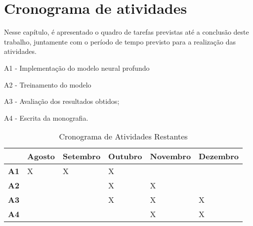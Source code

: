 \chapter{Cronograma de atividades}\label{cronograma}

Nesse capítulo, é apresentado o quadro de tarefas previstas até a conclusão deste
trabalho, juntamente com o período de tempo previsto para a realização das atividades.

A1 - Implementação do modelo neural profundo

A2 - Treinamento do modelo

A3 - Avaliação dos resultados obtidos;

A4 - Escrita da monografia.

\begin{table}[!htb]
\footnotesize
\centering
\caption{Cronograma de Atividades Restantes}
\label{tab:cronogramaativs}
\begin{tabular}{P{1cm}P{2cm}P{2cm}P{2cm}P{2cm}P{2cm}}
  \toprule
  & \textbf{Agosto} & \textbf{Setembro}  & \textbf{Outubro}  & \textbf{Novembro} & \textbf{Dezembro}  \\
  \midrule
  \textbf{A1} & X & X & X &   &   \\
  \textbf{A2} &   &   & X & X &   \\
  \textbf{A3} &   &   & X & X & X \\
  \textbf{A4} &   &   &   & X & X \\
  \bottomrule
\end{tabular}
\end{table}
